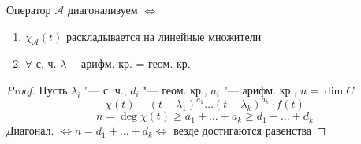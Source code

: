 \begin{implication}
	Оператор $ \mathcal{A} $ диагонализуем $ \iff $
	\begin{enumerate}
		\item $ \chi_{\mathcal{A}}(t) $ раскладывается на линейные множители
		\item $ \forall $ с. ч. $ \lambda \quad $ арифм. кр. = геом. кр.
	\end{enumerate}
\end{implication}

\begin{proof}
	Пусть $ \lambda_i $ "--- с. ч., $ d_i $ "--- геом. кр., $ a_i $ "--- арифм. кр., $ n = \dim C $
	$$ \chi(t) - (t - \lambda_1)^{a_1} \dots(t - \lambda_k)^{a_k} \cdot f(t) $$
	$$ n = \deg \chi(t) \ge a_1 + \dots + a_k \ge d_1 + \dots + d_k $$
	Диагонал. $ \iff n = d_1 + \dots + d_k \iff $ везде достигаются равенства
\end{proof}
